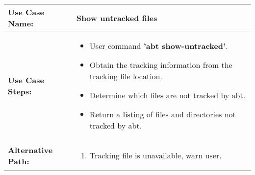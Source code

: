 \medskip

\begin{tabularx}{\linewidth}{|l|X|}
\hline
\textbf{Use Case Name:} & \textbf{Show untracked files} \\
\hline
\textbf{Use Case Steps:} & 
\begin{minipage}{\linewidth} 
  \vspace{0.05em}
  \begin{itemize}
    \item User command \textbf{'abt show-untracked'}.
    \item Obtain the tracking information from the tracking file location.
    \item Determine which files are not tracked by abt.
    \item Return a listing of files and directories not tracked by abt.
  \end{itemize}
  \vspace{0.05em}
\end{minipage}
\\
\hline 
\textbf{Alternative Path:} &
\begin{minipage}{\linewidth}
  \vspace{0.05em} 
  \begin{enumerate}
    \item Tracking file is unavailable, warn user.
  \end{enumerate}
  \vspace{0.05em} 
\end{minipage}
\\
\hline
\end{tabularx}